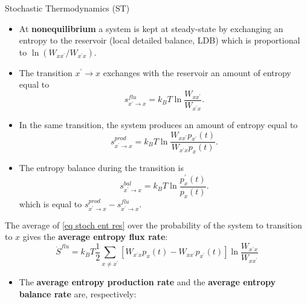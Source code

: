 \documentclass[final]{beamer}
\newlength{\colwidth}
\begin{document}
\begin{frame}[t]
\begin{columns}[t]
\begin{column}{\colwidth}
\begin{block}{Stochastic Thermodynamics (ST)}
\begin{itemize}
\item At {\bf nonequilibrium} a system is kept at steady-state by exchanging an entropy to the reservoir (local detailed balance, LDB) which is proportional to $\ln (W_{xx^\prime} / W_{x^\prime x})$\cite{10.21468/SciPostPhysLectNotes.32}.
\end{itemize}
\begin{itemize}
\justifying
\item The transition $x^\prime \rightarrow x$ exchanges with the reservoir an amount of entropy equal to
%
\begin{equation}
s^{flu}_{x^\prime \rightarrow x} = k_B T \ln \frac{W_{xx^\prime}}{W_{x^\prime x}}.
\label{eq stoch ent res}
\end{equation}
%
\item In the same transition, the system produces an amount of entropy equal to
%
\begin{equation*}
s^{prod}_{x^\prime \rightarrow x} = k_B T \ln \frac{W_{xx^\prime}p_{x^\prime}(t)}{W_{x^\prime x}p_x(t)}.
\label{eq stoch ent prod}
\end{equation*}
%
\item The entropy balance during the transition is
%
\begin{equation*}
s^{bal}_{x^\prime \rightarrow x} = k_B T \ln \frac{p_x^\prime(t)}{p_x(t)}.
\label{eq stoch ent bal}
\end{equation*}
%
which is equal to $s^{prod}_{x^\prime \rightarrow x} - s^{flu}_{x^\prime \rightarrow x}$.
%
\end{itemize}
The average of \eqref{eq stoch ent res} over the probability of the system to transition to $x$ gives the {\bf average entropy flux rate}\cite{peliti2021stochastic}:
%
\begin{equation*}
\dot{S}^{flu} = k_B T \frac{1}{2} \sum_{x \neq x^\prime} \left[ W_{x^\prime x} p_x(t) -  W_{x x^\prime}p_{x^\prime}(t) \right] \ln \frac{W_{x^\prime x}}{W_{xx^\prime}}
\end{equation*}
%
\begin{itemize}
\item The {\bf average entropy production rate} and the {\bf average entropy balance rate}\cite{Schnakenberg:1976aa} are, respectively:

\end{itemize}
\end{block}
\end{column}
\end{columns}
\end{frame}
\end{document}
